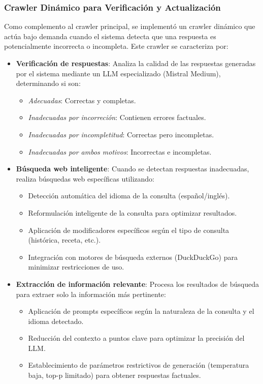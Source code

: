 \documentclass[runningheads]{llncs}
\begin{document}
\subsubsection{Crawler Dinámico para Verificación y Actualización}

Como complemento al crawler principal, se implementó un crawler dinámico que actúa bajo demanda cuando el sistema detecta que una respuesta es potencialmente incorrecta o incompleta. Este crawler se caracteriza por:

\begin{itemize}
    \item \textbf{Verificación de respuestas}: Analiza la calidad de las respuestas generadas por el sistema mediante un LLM especializado (Mistral Medium), determinando si son:
    \begin{itemize}
        \item \textit{Adecuadas}: Correctas y completas.
        \item \textit{Inadecuadas por incorreción}: Contienen errores factuales.
        \item \textit{Inadecuadas por incompletitud}: Correctas pero incompletas.
        \item \textit{Inadecuadas por ambos motivos}: Incorrectas e incompletas.
    \end{itemize}
    
    \item \textbf{Búsqueda web inteligente}: Cuando se detectan respuestas inadecuadas, realiza búsquedas web específicas utilizando:
    \begin{itemize}
        \item Detección automática del idioma de la consulta (español/inglés).
        \item Reformulación inteligente de la consulta para optimizar resultados.
        \item Aplicación de modificadores específicos según el tipo de consulta (histórica, receta, etc.).
        \item Integración con motores de búsqueda externos (DuckDuckGo) para minimizar restricciones de uso.
    \end{itemize}
    
    \item \textbf{Extracción de información relevante}: Procesa los resultados de búsqueda para extraer solo la información más pertinente:
    \begin{itemize}
        \item Aplicación de prompts específicos según la naturaleza de la consulta y el idioma detectado.
        \item Reducción del contexto a puntos clave para optimizar la precisión del LLM.
        \item Establecimiento de parámetros restrictivos de generación (temperatura baja, top-p limitado) para obtener respuestas factuales.
    \end{itemize}
    

\end{itemize}
\end{document}
